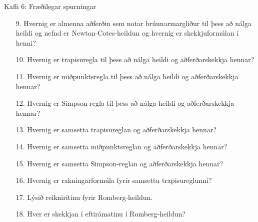 \begin{frame}{Kafli 6: Fræðilegar spurningar}
  \begin{enumerate}
  \item [9.] Hvernig er almenna aðferðin sem notar brúunarmargliður til þess
    að nálga heildi og nefnd er Newton-Cotes-heildun og hvernig er
    skekkjuformúlan í henni? 
  \item [10.] Hvernig er trapisuregla til þess að nálga heildi og
   aðferðarskekkja hennar?
  \item [11.] Hvernig er miðpunktsregla til þess að nálga heildi og
   aðferðarskekkja hennar? 
  \item [12.] Hvernig er Simpson-regla til þess að nálga heildi og
    aðferðarskekkja hennar?
  \item [13.] Hvernig er samsetta trapisureglan og 
    aðferðarskekkja hennar?
  \item [14.] Hvernig er samsetta miðpunktsreglan og 
 aðferðarskekkja hennar? 
  \item [15.]  Hvernig er samsetta Simpson-reglan og 
aðferðarskekkja hennar?
  \item [16.] Hvernig er rakningarformúla fyrir samsettu trapisureglunni?
  \item [17.] Lýsið reikniritinu fyrir Romberg-heildun.
  \item [18.] Hver er skekkjan í eftirámatinu í Romberg-heildun?
   \end{enumerate}
\end{frame}

